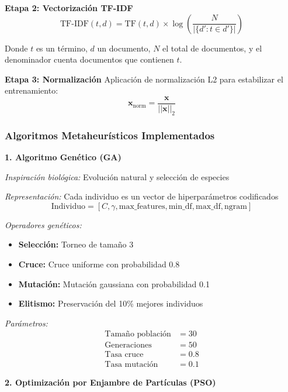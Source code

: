 \textbf{Etapa 2: Vectorización TF-IDF}
\begin{equation}
\text{TF-IDF}(t,d) = \text{TF}(t,d) \times \log\left(\frac{N}{|\{d' : t \in d'\}|}\right)
\end{equation}

Donde $t$ es un término, $d$ un documento, $N$ el total de documentos, y el denominador cuenta documentos que contienen $t$.

\textbf{Etapa 3: Normalización}
Aplicación de normalización L2 para estabilizar el entrenamiento:
\begin{equation}
\mathbf{x}_{\text{norm}} = \frac{\mathbf{x}}{||\mathbf{x}||_2}
\end{equation}

\subsubsection{Algoritmos Metaheurísticos Implementados}

\textbf{1. Algoritmo Genético (GA)}

\textit{Inspiración biológica:} Evolución natural y selección de especies

\textit{Representación:} Cada individuo es un vector de hiperparámetros codificados
\begin{equation}
\text{Individuo} = [C, \gamma, \text{max\_features}, \text{min\_df}, \text{max\_df}, \text{ngram}]
\end{equation}

\textit{Operadores genéticos:}
\begin{itemize}
    \item \textbf{Selección:} Torneo de tamaño 3
    \item \textbf{Cruce:} Cruce uniforme con probabilidad 0.8
    \item \textbf{Mutación:} Mutación gaussiana con probabilidad 0.1
    \item \textbf{Elitismo:} Preservación del 10\% mejores individuos
\end{itemize}

\textit{Parámetros:}
\begin{align}
\text{Tamaño población} &= 30 \\
\text{Generaciones} &= 50 \\
\text{Tasa cruce} &= 0.8 \\
\text{Tasa mutación} &= 0.1
\end{align}

\textbf{2. Optimización por Enjambre de Partículas (PSO)}

